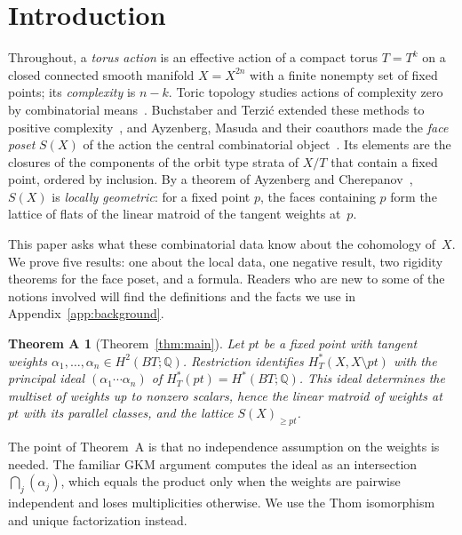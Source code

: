 \documentclass[11pt,a4paper]{article}
\numberwithin{equation}{section}
\theoremstyle{plain}
\newtheorem*{theoremA}{Theorem A}
\theoremstyle{definition}
\theoremstyle{remark}
\newcommand{\Q}{\mathbb{Q}}
\newcommand{\HT}{H^{*}_{T}}
\begin{document}
\setcounter{tocdepth}{1}
\tableofcontents

\section{Introduction}

Throughout, a \emph{torus action} is an effective action of a compact torus $T=T^k$ on a closed connected smooth manifold $X=X^{2n}$ with a finite nonempty set of fixed points; its \emph{complexity} is $n-k$. Toric topology studies actions of complexity zero by combinatorial means~\cite{BP15}. Buchstaber and Terzić extended these methods to positive complexity~\cite{BT19a,BT19b}, and Ayzenberg, Masuda and their coauthors made the \emph{face poset} $S(X)$ of the action the central combinatorial object~\cite{AC22,AMS23,AB24}. Its elements are the closures of the components of the orbit type strata of $X/T$ that contain a fixed point, ordered by inclusion. By a theorem of Ayzenberg and Cherepanov~\cite{AC22}, $S(X)$ is \emph{locally geometric}: for a fixed point $p$, the faces containing $p$ form the lattice of flats of the linear matroid of the tangent weights at~$p$.

This paper asks what these combinatorial data know about the cohomology of~$X$. We prove five results: one about the local data, one negative result, two rigidity theorems for the face poset, and a formula. Readers who are new to some of the notions involved will find the definitions and the facts we use in Appendix~\ref{app:background}.

\begin{theoremA}[Theorem~\ref{thm:main}]
Let $pt$ be a fixed point with tangent weights $\alpha_1,\dots,\alpha_n\in H^2(BT;\Q)$. Restriction identifies $\HT(X,X\setminus pt)$ with the principal ideal $(\alpha_1\cdots\alpha_n)$ of $\HT(pt)=H^*(BT;\Q)$. This ideal determines the multiset of weights up to nonzero scalars, hence the linear matroid of weights at $pt$ with its parallel classes, and the lattice $S(X)_{\geqslant pt}$.
\end{theoremA}

The point of Theorem~A is that no independence assumption on the weights is needed. The familiar GKM argument computes the ideal as an intersection $\bigcap_j(\alpha_j)$, which equals the product only when the weights are pairwise independent and loses multiplicities otherwise. We use the Thom isomorphism and unique factorization instead.
\end{document}
